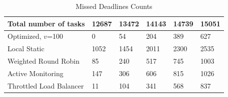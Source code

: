\begin{table}[h]
\small
\caption{Missed Deadlines Counts}
\centering
\begin{tabular}{|m{1.5cm}|m{0.75cm}|m{0.75cm}|m{0.75cm}|m{0.75cm}|m{0.75cm}|}
    \hline
    \textbf{Total number of tasks} & \textbf{12687} & \textbf{13472} & \textbf{14143} & \textbf{14739} & \textbf{15051} \\ 
    \hline
    Optimized, $v$=100 & 0 & 54 & 204 & 389 & 627 \\
    \hline
    Local Static & 1052 & 1454 & 2011 & 2300 & 2535 \\
    \hline
    Weighted Round Robin & 85 & 240 & 517 & 745& 1003 \\
    \hline
    Active Monitoring & 147 & 306 & 606 & 815& 1026 \\
    \hline
    Throttled Load Balancer & 11 & 104 & 341 & 568& 837 \\
    \hline
\end{tabular}
\label{good}
\end{table}




